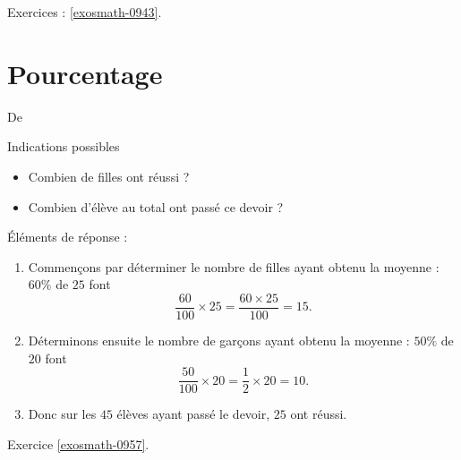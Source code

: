 Exercices : \ref{exosmath-0943}.

\section{Pourcentage}


De \cite{NRHooXFvgpp4}

Indications possibles
\begin{itemize}
    \item Combien de filles ont réussi ?
    \item Combien d'élève au total ont passé ce devoir ?
\end{itemize}

Éléments de réponse :
\begin{enumerate}
    \item
        Commençons par déterminer le nombre de filles ayant obtenu la moyenne : \( 60\%\) de \( 25\) font
        \begin{equation}
            \frac{ 60 }{ 100 }\times 25=\frac{ 60\times 25 }{ 100 }=15.
        \end{equation}
    \item
        Déterminons ensuite le nombre de garçons ayant obtenu la moyenne : \( 50\%\) de \( 20\) font
        \begin{equation}
            \frac{ 50 }{ 100 }\times 20=\frac{ 1 }{2}\times 20=10.
        \end{equation}
    \item
        Donc sur les \( 45\) élèves ayant passé le devoir, \( 25\) ont réussi.
\end{enumerate}

Exercice \ref{exosmath-0957}.
